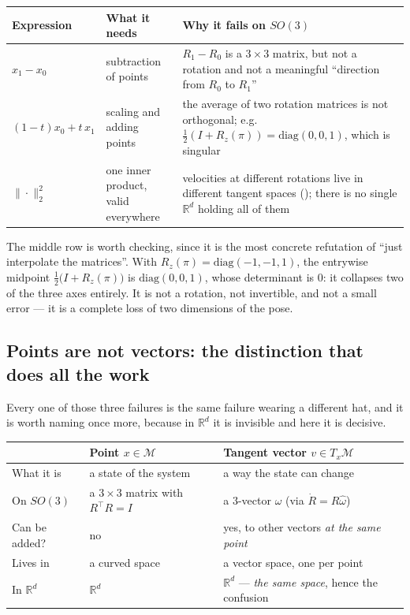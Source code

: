 \documentclass[11pt,a4paper]{report}
\theoremstyle{definition}
\theoremstyle{remark}
\newcommand{\RR}{\mathbb R}
\begin{document}
\begin{center}
\begin{tabular}{p{3.4cm}p{5.0cm}p{5.4cm}}
\toprule
Expression & What it needs & Why it fails on $SO(3)$ \\
\midrule
$x_1-x_0$
& subtraction of points
& $R_1-R_0$ is a $3\times3$ matrix, but not a rotation and not a
  meaningful ``direction from $R_0$ to $R_1$'' \\[1ex]
$(1-t)x_0+t\,x_1$
& scaling and adding points
& the average of two rotation matrices is not orthogonal; e.g.\
  $\tfrac12(I+R_z(\pi))=\mathrm{diag}(0,0,1)$, which is singular \\[1ex]
$\|\cdot\|_2^2$
& one inner product, valid everywhere
& velocities at different rotations live in different tangent spaces
  (\Cref{sec:why-tangent}); there is no single $\RR^d$ holding all of them \\
\bottomrule
\end{tabular}
\end{center}

The middle row is worth checking, since it is the most concrete refutation
of ``just interpolate the matrices''. With
$R_z(\pi)=\mathrm{diag}(-1,-1,1)$, the entrywise midpoint
$\tfrac12\bigl(I+R_z(\pi)\bigr)$ is $\mathrm{diag}(0,0,1)$, whose
determinant is $0$: it collapses two of the three axes entirely. It is not
a rotation, not invertible, and not a small error --- it is a complete loss
of two dimensions of the pose.

\subsection{Points are not vectors: the distinction that does all the work}
\label{sec:rfm-points-vs-vectors}

Every one of those three failures is the same failure wearing a different
hat, and it is worth naming once more, because in $\RR^d$ it is invisible
and here it is decisive.

\begin{center}
\begin{tabular}{p{4.2cm}p{4.6cm}p{4.6cm}}
\toprule
& \textbf{Point} $x\in\mathcal M$ & \textbf{Tangent vector} $v\in T_x\mathcal M$ \\
\midrule
What it is & a state of the system & a way the state can change \\
On $SO(3)$ & a $3\times3$ matrix with $R^\top R=I$ & a $3$-vector $\omega$ (via $\dot R=R\widehat\omega$) \\
Can be added? & no & yes, to other vectors \emph{at the same point} \\
Lives in & a curved space & a vector space, one per point \\
In $\RR^d$ & $\RR^d$ & $\RR^d$ --- \emph{the same space}, hence the confusion \\
\bottomrule
\end{tabular}
\end{center}
\end{document}

